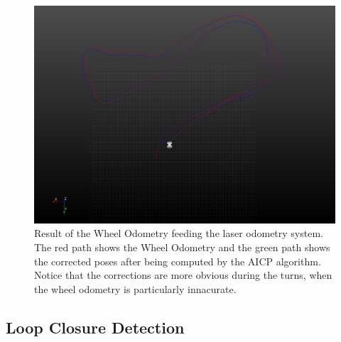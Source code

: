 \documentclass[11pt]{article}
\begin{document}
	\begin{figure}
	\begin{minipage}{0.65\textwidth}
		\centering
		\includegraphics[width=\textwidth]{LaserOdometry1}
	\end{minipage} \hfill
	\begin{minipage}{0.35\textwidth}
		\centering
		\caption[t]{Result of the Wheel Odometry feeding the laser odometry system. The red path shows the Wheel Odometry and the green path shows the corrected poses after being computed by the AICP algorithm. Notice that the corrections are more obvious during the turns, when the wheel odometry is particularly innacurate.}
		\label{fig:LaserOdometry1}	
	\end{minipage}				
	\end{figure}
	
	\subsection{Loop Closure Detection}
\end{document}
